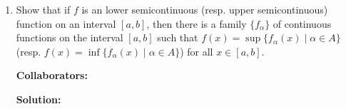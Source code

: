 \documentclass{article}%
\begin{document}
\begin{enumerate}
\item Show that if $f$ is an lower semicontinuous (resp. upper semicontinuous) function on an interval $[a,b]$, then there is a family $\{f_{\alpha}\}$ of continuous functions on the interval $[a,b]$ such that $f(x) = \sup\{f_{\alpha}(x) \mid \alpha \in A \}$ (resp. $f(x) = \inf\{f_{\alpha}(x) \mid \alpha \in A \}$) for all $x \in [a,b]$.  


\bigskip
\textbf{Collaborators:}\\
\smallskip
 
\textbf{Solution:}
\bigskip






\end{enumerate}
\end{document}
